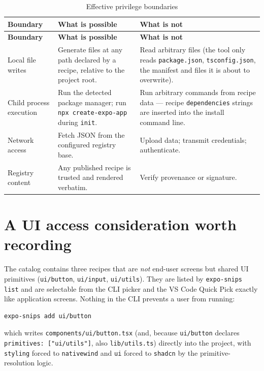 \begin{longtable}{@{}L{4.4cm}L{5.4cm}L{4.6cm}@{}}
\caption{Effective privilege boundaries}\\
\toprule
\textbf{Boundary} & \textbf{What is possible} & \textbf{What is not} \\
\midrule
\endfirsthead
\toprule
\textbf{Boundary} & \textbf{What is possible} & \textbf{What is not} \\
\midrule
\endhead
Local file writes & Generate files at any path declared by a recipe, relative to the
project root. & Read arbitrary files (the tool only reads \texttt{package.json},
\texttt{tsconfig.json}, the manifest and files it is about to overwrite). \\
Child process execution & Run the detected package manager; run \texttt{npx
create-expo-app} during \texttt{init}. & Run arbitrary commands from recipe data ---
recipe \texttt{dependencies} strings are inserted into the install command line. \\
Network access & Fetch JSON from the configured registry base. & Upload data;
transmit credentials; authenticate. \\
Registry content & Any published recipe is trusted and rendered verbatim. & Verify
provenance or signature. \\
\bottomrule
\end{longtable}

\section{A UI access consideration worth recording}

The catalog contains three recipes that are \emph{not} end-user screens but shared
UI primitives (\texttt{ui/button}, \texttt{ui/input}, \texttt{ui/utils}). They are
listed by \texttt{expo-snips list} and are selectable from the CLI picker and the
VS Code Quick Pick exactly like application screens. Nothing in the CLI prevents a
user from running:

\begin{lstlisting}[language=bash]
expo-snips add ui/button
\end{lstlisting}

which writes \texttt{components/ui/button.tsx} (and, because \texttt{ui/button}
declares \texttt{primitives: ["ui/utils"]}, also \texttt{lib/utils.ts}) directly
into the project, with \texttt{styling} forced to \texttt{nativewind} and
\texttt{ui} forced to \texttt{shadcn} by the primitive-resolution logic.

